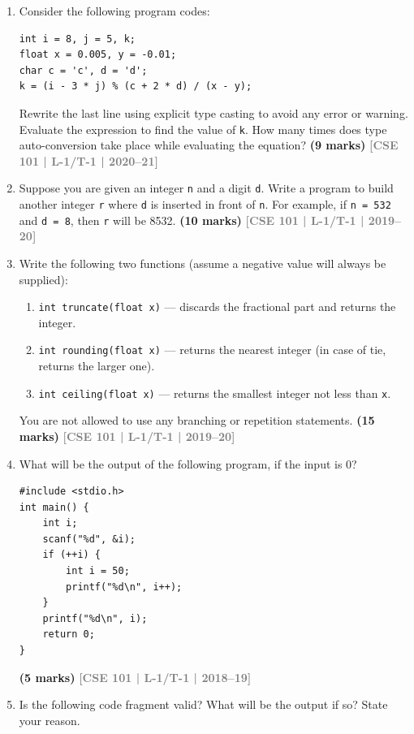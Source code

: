 \documentclass[12pt,a3paper]{article}
\newcommand{\yr}[1]{\hfill\textcolor{gray}{\small\textbf{[#1]}}}
\newcommand{\mk}[1]{\textcolor{orange!70!black}{\small\textbf{(#1 marks)}}}
\begin{document}
\begin{enumerate}
\item Consider the following program codes:
 
\begin{lstlisting}
int i = 8, j = 5, k;
float x = 0.005, y = -0.01;
char c = 'c', d = 'd';
k = (i - 3 * j) % (c + 2 * d) / (x - y);
\end{lstlisting}
Rewrite the last line using explicit type casting to avoid any error or warning. Evaluate the expression to find the value of \texttt{k}. How many times does type auto-conversion take place while evaluating the equation?
\mk{9} \yr{CSE 101 | L-1/T-1 | 2020--21}

\item Suppose you are given an integer \texttt{n} and a digit \texttt{d}. Write a program to build another integer \texttt{r} where \texttt{d} is inserted in front of \texttt{n}. For example, if \texttt{n = 532} and \texttt{d = 8}, then \texttt{r} will be 8532.
\mk{10} \yr{CSE 101 | L-1/T-1 | 2019--20}

\item Write the following two functions (assume a negative value will always be supplied):
\begin{enumerate}
  \item \texttt{int truncate(float x)} --- discards the fractional part and returns the integer.
  \item \texttt{int rounding(float x)} --- returns the nearest integer (in case of tie, returns the larger one).
  \item \texttt{int ceiling(float x)} --- returns the smallest integer not less than \texttt{x}.
\end{enumerate}
You are not allowed to use any branching or repetition statements.
\mk{15} \yr{CSE 101 | L-1/T-1 | 2019--20}

\item What will be the output of the following program, if the input is 0?
 
\begin{lstlisting}
#include <stdio.h>
int main() {
    int i;
    scanf("%d", &i);
    if (++i) {
        int i = 50;
        printf("%d\n", i++);
    }
    printf("%d\n", i);
    return 0;
}
\end{lstlisting}
\mk{5} \yr{CSE 101 | L-1/T-1 | 2018--19}

\item Is the following code fragment valid? What will be the output if so? State your reason.
 

\end{enumerate}
\end{document}
